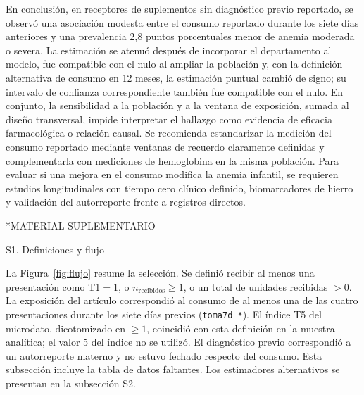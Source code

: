 \documentclass[man,11pt,donotrepeattitle,floatsintext]{apa7}
\makeatletter
\renewcommand{\section}{\@startsection {section}{1}{\z@}%
    {\b@level@one@skip}{\e@level@one@skip}%
    {\normalfont\large\bfseries\raggedright}}
\renewcommand{\subsection}{\@startsection{subsection}{2}{\z@}%
    {\b@level@two@skip}{\e@level@two@skip}%
    {\normalfont\normalsize\bfseries\raggedright}}
\makeatother
\begin{document}
En conclusión, en receptores de suplementos sin diagnóstico previo reportado, se observó una asociación modesta entre el consumo reportado durante los siete días anteriores y una prevalencia 2{,}8 puntos porcentuales menor de anemia moderada o severa. La estimación se atenuó después de incorporar el departamento al modelo, fue compatible con el nulo al ampliar la población y, con la definición alternativa de consumo en 12 meses, la estimación puntual cambió de signo; su intervalo de confianza correspondiente también fue compatible con el nulo. En conjunto, la sensibilidad a la población y a la ventana de exposición, sumada al diseño transversal, impide interpretar el hallazgo como evidencia de eficacia farmacológica o relación causal. Se recomienda estandarizar la medición del consumo reportado mediante ventanas de recuerdo claramente definidas y complementarla con mediciones de hemoglobina en la misma población. Para evaluar si una mejora en el consumo modifica la anemia infantil, se requieren estudios longitudinales con tiempo cero clínico definido, biomarcadores de hierro y validación del autorreporte frente a registros directos.


\section*{MATERIAL SUPLEMENTARIO}

\subsection{S1. Definiciones y flujo}

La Figura~\ref{fig:flujo} resume la selección. Se definió recibir al menos una presentación como T1${}=1$, o $n_{\text{recibidos}}\ge 1$, o un total de unidades recibidas ${}>0$. La exposición del artículo correspondió al consumo de al menos una de las cuatro presentaciones durante los siete días previos (\texttt{toma7d\_*}). El índice T5 del microdato, dicotomizado en $\ge 1$, coincidió con esta definición en la muestra analítica; el valor 5 del índice no se utilizó. El diagnóstico previo correspondió a un autorreporte materno y no estuvo fechado respecto del consumo. Esta subsección incluye la tabla de datos faltantes. Los estimadores alternativos se presentan en la subsección S2.
\end{document}

